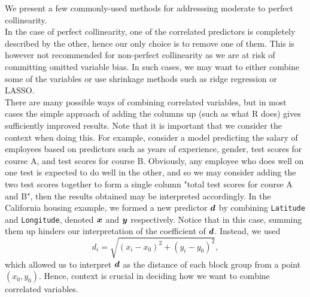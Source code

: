 \documentclass[12pt]{article}
\begin{document}
	We present a few commonly-used methods for addresssing moderate to perfect collinearity. \\
	
	In the case of perfect collinearity, one of the correlated predictors is completely described by the other, hence our only choice is to remove one of them. This is however not recommended for non-perfect collinearity as we are at risk of committing omitted variable bias. In such cases, we may want to either combine some of the variables \cite{James2023} or use shrinkage methods such as ridge regression or LASSO.\\
	
	There are many possible ways of combining correlated variables, but in most cases the simple approach of adding the columns up (such as what R does) gives sufficiently improved results. Note that it is important that we consider the context when doing this. For example, consider a model predicting the salary of employees based on predictors such as years of experience, gender, test scores for course A, and test scores for course B. Obviously, any employee who does well on one test is expected to do well in the other, and so we may consider adding the two test scores together to form a single column "total test scores for course A and B", then the results obtained may be interpreted accordingly. In the California housing example, we formed a new predictor $\boldsymbol{d}$ by combining \texttt{Latitude} and \texttt{Longitude}, denoted $\boldsymbol{x}$ and $\boldsymbol{y}$ respectively. Notice that in this case, summing them up hinders our interpretation of the coefficient of $\boldsymbol{d}$. Instead, we used
	\begin{equation}
		d_i=\sqrt{(x_{i}-x_0)^2+(y_i-y_0)^2},
	\end{equation}
	which allowed us to interpret $\boldsymbol{d}$ as the distance of each block group from a point $(x_0,y_0)$. Hence, context is crucial in deciding how we want to combine correlated variables.\\
	
\end{document}
